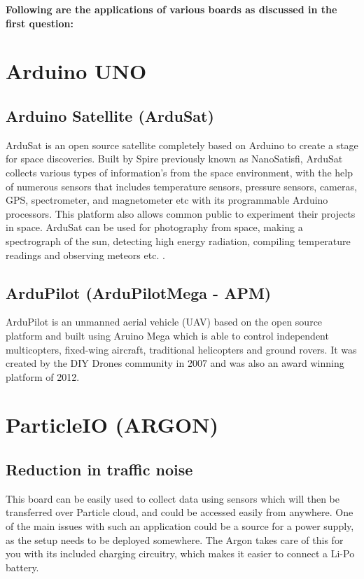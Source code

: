 \documentclass[a4paper,11pt]{article}
\begin{document}
\begin{iotsolution}
\textbf{\large{Following are the applications of various boards as discussed in the first question:}}
\section{Arduino UNO}
\subsection{Arduino Satellite (ArduSat)}
ArduSat is an open source satellite completely based on Arduino to create a stage for space
discoveries. Built by Spire previously known as NanoSatisfi, ArduSat collects various types of
information’s from the space environment, with the help of numerous sensors that includes
temperature sensors, pressure sensors, cameras, GPS, spectrometer, and magnetometer etc with its programmable Arduino processors.
This platform also allows common public to experiment their projects in space. ArduSat can be
used for photography from space, making a spectrograph of the sun, detecting high energy
radiation, compiling temperature readings and observing meteors etc. .

\subsection{ArduPilot (ArduPilotMega - APM)}
ArduPilot is an unmanned aerial vehicle (UAV) based on the open source platform and built using
Aruino Mega which is able to control independent multicopters, fixed-wing aircraft, traditional
helicopters and ground rovers. It was created by the DIY Drones community in 2007 and was also an award winning platform of 2012.

\section{ParticleIO  (ARGON)}

\subsection{Reduction in traffic noise}
This board can be easily used to collect data using sensors which will then be transferred over Particle cloud, and could be accessed easily from anywhere. One of the main issues with such an application could be a source for a power supply, as the setup needs to be deployed somewhere. The Argon takes care of this for you with its included charging circuitry, which makes it easier to connect a Li-Po battery.



\end{iotsolution}
\end{document}
